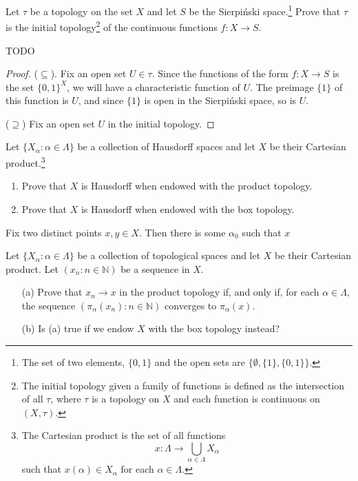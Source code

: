 \documentclass[../../main.tex]{subfiles}
\begin{document}
\begin{problem}[7]
Let $\tau$ be a topology on the set $X$ and let $S$ be the Sierpi\'nski space.\footnote{
	The set of two elements, $\{0, 1\}$ and the open sets are $\{ \emptyset, \{1\}, \{0, 1\} \}$.}
Prove that $\tau$ is the initial topology\footnote{The initial topology given a family of functions is defined as the intersection of all $\tau$, where $\tau$ is a topology on $X$ and each function is continuous on $(X, \tau)$.}
of the continuous functions $f : X \to S$.
\end{problem}
{\huge TODO}
\begin{proof}
	($\subseteq$). Fix an open set $U \in \tau$.
	Since the functions of the form $f : X \to S$ is the set $\{0, 1\}^X$, we will have a characteristic function of $U$.
	The preimage $\{1\}$ of this function is $U$, and since $\{1\}$ is open in the Sierpi\'nski space, so is $U$.

	($\supseteq$) Fix an open set $U$ in the initial topology.
\end{proof}

\begin{problem}
    Let $\{ X_\alpha : \alpha \in \Lambda \}$ be a collection of Hausdorff spaces and let $X$ be their Cartesian product.\footnote{
        The Cartesian product is the set of all functions
        \[ x : \Lambda \to \bigcup_{\alpha \in \Lambda} X_\alpha \]
        such that $x(\alpha) \in X_\alpha$ for each $\alpha \in \Lambda$.
    }
\end{problem}
\begin{enumerate}[label=(\alph*)]
	\item Prove that $X$ is Hausdorff when endowed with the product topology.
	\item Prove that $X$ is Hausdorff when endowed with the box topology.
\end{enumerate}
Fix two distinct points $x, y \in X$.
Then there is some $\alpha_0$ such that $x$

\begin{problem}[10]
Let $\{X_\alpha:\alpha\in\Lambda\}$ be a collection of topological spaces and let $X$ be their Cartesian product.
Let $(x_n:n\in\mathbb{N})$ be a sequence in $X$.
\begin{enumerate}
    \item[(a)] Prove that $x_n \to x$ in the product topology if, and only if, for each $\alpha\in\Lambda$, the sequence $(\pi_\alpha(x_n):n\in\mathbb{N})$ converges to $\pi_\alpha(x)$.
    \item[(b)] Is (a) true if we endow $X$ with the box topology instead?
\end{enumerate}
\end{problem}
\end{document}
